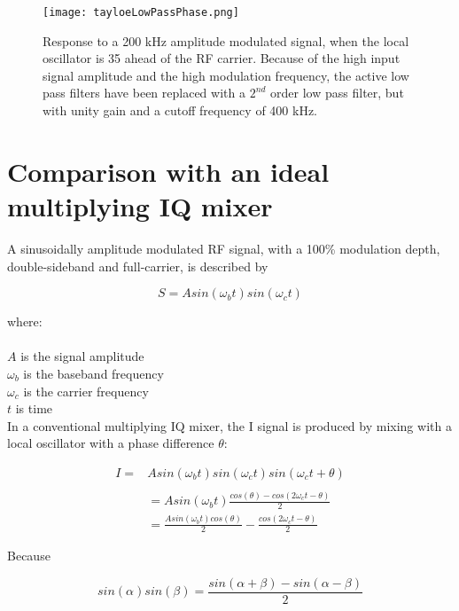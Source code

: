 \documentclass[11pt, twoside]{article}
\begin{document}
\begin{figure}
  \center
    \captionsetup{width=.8\linewidth}
  \texttt{[image: tayloeLowPassPhase.png]}
  \caption{Response to a 200 kHz amplitude modulated signal, when the
    local oscillator is 35{\degree} ahead of the RF carrier. Because
    of the high input signal amplitude and the high modulation
    frequency, the active low pass filters have been replaced with a
    $2^{nd}$ order low pass filter, but with unity gain and a cutoff
    frequency of 400 kHz.}
  \label{figure:tayloelowpassphase}
\end{figure}

\section{Comparison with an ideal multiplying IQ mixer}

A sinusoidally amplitude modulated RF signal, with a 100\% modulation
depth, double-sideband and full-carrier, is described by

\begin{equation*}
S = A sin({\omega_b}t) sin({\omega_c}t)
\end{equation*}

where:\\
\\
$A$ is the signal amplitude\\
$\omega_b$ is the baseband frequency\\
$\omega_c$ is the carrier frequency \\
  $t$ is time\\

In a conventional multiplying IQ mixer, the I signal is produced by
mixing with a local oscillator with a phase difference $\theta$:

\begin{align*}
I =& A sin({\omega_b}t)  sin({\omega}_ct)sin({\omega}_ct + \theta) \\
\\
&= A sin({\omega_b}t)  \frac{cos(\theta) - cos(2 {\omega}_ct - \theta)}{2}
\\
&= \frac{A sin({\omega_b}t) cos(\theta)}{2} - \frac{cos(2 {\omega_c}t - \theta)}{2}
\end{align*}

Because

\begin{equation*}
  sin(\alpha) sin(\beta) = \frac{sin(\alpha + \beta) - sin(\alpha - \beta)}{2}
\end{equation*}
\end{document}
